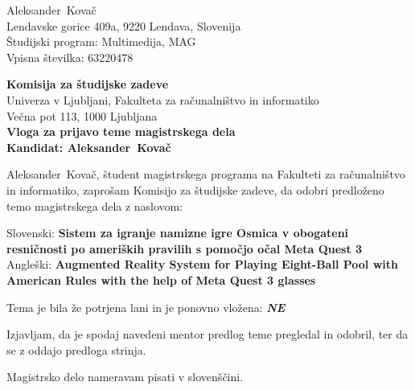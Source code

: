 \documentclass[a4paper, 12pt]{article}
\begin{document}
\newcommand{\ImeKandidata}{Aleksander} %
\newcommand{\PriimekKandidata}{Kovač} %
\newcommand{\VpisnaStevilka}{63220478} %
\newcommand{\StudijskiProgram}{Multimedija, MAG} %
\newcommand{\NaslovBivalisca}{Lendavske gorice 409a, 9220 Lendava, Slovenija} %
\newcommand{\SLONaslov}{Sistem za igranje namizne igre Osmica v obogateni resničnosti po ameriških pravilih s pomočjo
očal Meta Quest 3 } %
\newcommand{\ENGNaslov}{Augmented Reality System for Playing Eight-Ball Pool with American Rules
with the help of Meta Quest 3 glasses} %

\newcommand{\Kandidat}{\ImeKandidata~\PriimekKandidata}
\noindent
\Kandidat\\
\NaslovBivalisca \\
Študijski program: \StudijskiProgram \\
Vpisna številka: \VpisnaStevilka
\bigskip

{\bf Komisija za študijske zadeve}\\
Univerza v Ljubljani, Fakulteta za računalništvo in informatiko\\
Večna pot 113, 1000 Ljubljana\\

{\Large\bf
{\centering
    Vloga za prijavo teme magistrskega dela \\%
\large Kandidat: \Kandidat \\[10mm]}}


\Kandidat, študent magistrskega programa na Fakulteti za računalništvo in informatiko, zaprošam Komisijo za študijske zadeve, da odobri predloženo temo magistrskega dela z naslovom:

Slovenski: {\bf \SLONaslov}\\
Angleški: {\bf \ENGNaslov}

Tema je bila že potrjena lani in je ponovno vložena: {\bf \textit{NE} }

Izjavljam, da je spodaj navedeni mentor predlog teme pregledal in odobril, ter da se z oddajo predloga strinja.

Magistrsko delo nameravam pisati v slovenščini. %
\end{document}

